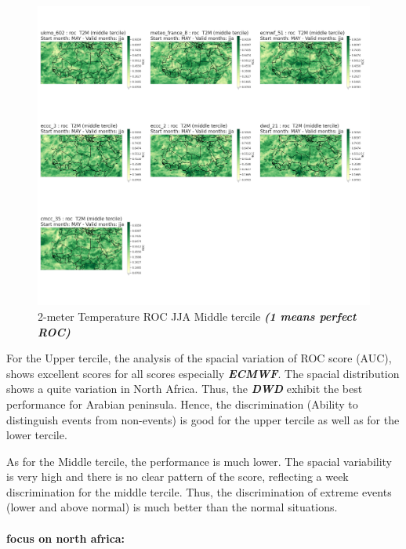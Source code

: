\begin{figure}[H]
    \centering
    \includegraphics[width=1\linewidth]{plots/prob/roc/roc_jja_t2m_middle.png}
    \caption{2-meter Temperature ROC JJA Middle tercile \textbf{\textit{(1 means perfect ROC)}}}
\end{figure}

For the Upper tercile, the analysis of the spacial variation of ROC score (AUC), shows excellent scores for all scores especially \textbf{\textit{ECMWF}}. The spacial distribution shows a quite variation in North Africa. Thus, the \textbf{\textit{DWD}} exhibit the best performance for Arabian peninsula. Hence, the discrimination (Ability to distinguish
events from non-events) is good for the upper tercile as well as for the lower tercile.

As for the Middle tercile, the performance is much lower. The spacial variability is very high and there is no clear pattern of the score, reflecting a week discrimination for the middle tercile. Thus, the discrimination of extreme events (lower and above normal) is much better than the normal situations.

\paragraph{focus on north africa:}



